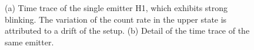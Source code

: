 		\begin{figure}[htp]
			\begin{subfigure}[tp]{ 0.49\linewidth}
				\centering
				\caption{}\label{subfig::blink_long}
			\end{subfigure}
			\hfill
			\begin{subfigure}[tp]{ 0.49\linewidth}
				\centering
				\caption{}\label{subfig::blink_short}
			\end{subfigure}
			\caption[Time trace of a single emitter.]{(a) Time trace of the single emitter H1, which exhibits strong blinking. The variation of the count rate in the upper state is attributed to a drift of the setup. (b) Detail of the time trace of the same emitter.}
			\label{fig::blink}
		\end{figure}

